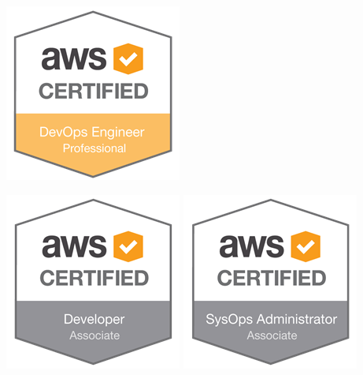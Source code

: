 \documentclass[]{cv-a4}
\begin{document}
\begin{multicols}{3}
  \begin{center}
    \includegraphics[width=0.7\linewidth]{images/DOP.png}

    \includegraphics[width=0.45\linewidth]{images/DVA.png}
    \includegraphics[width=0.45\linewidth]{images/SOA.png}
  \end{center}
  \vfill\null

  \columnbreak


\end{multicols}
\end{document}
